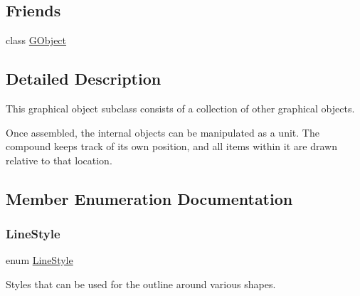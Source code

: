 \subsection*{Friends}
\begin{DoxyCompactItemize}
\item 
class \mbox{\hyperlink{classGCompound_ac45aa544268532ae1e01fee410b917bf}{G\+Object}}
\end{DoxyCompactItemize}


\subsection{Detailed Description}
This graphical object subclass consists of a collection of other graphical objects. 

Once assembled, the internal objects can be manipulated as a unit. The compound keeps track of its own position, and all items within it are drawn relative to that location. 

\subsection{Member Enumeration Documentation}
\mbox{\label{classGObject_a86e0f5648542856159bb40775c854aa7}} 
\subsubsection{\texorpdfstring{Line\+Style}{LineStyle}}
{\footnotesize\ttfamily enum \mbox{\hyperlink{classGObject_a86e0f5648542856159bb40775c854aa7}{Line\+Style}}\hspace{0.3cm}{\ttfamily [inherited]}}



Styles that can be used for the outline around various shapes. 

